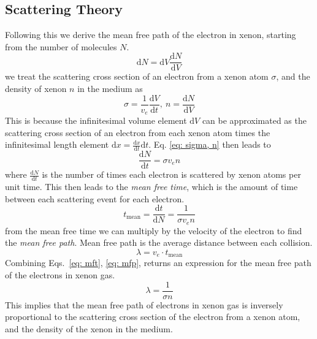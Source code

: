 \documentclass{article}
\begin{document}
\subsection{Scattering Theory}
\indent Following this we derive the mean free path of the electron in xenon, starting from the number of molecules $N$.
\begin{equation}
\mathrm{d}N = \mathrm{d}V\frac{\mathrm{d}N}{\mathrm{d}V}
\end{equation}
we treat the scattering cross section of an electron from a xenon atom $\sigma$, and the density of xenon $n$ in the medium as 
\begin{equation}
\sigma = \frac{1}{v_e}\frac{\mathrm{d}V}{\mathrm{d}t},~n=\frac{\mathrm{d}N}{\mathrm{d}V}
\label{eq: sigma, n}
\end{equation}
This is because the infinitesimal volume element $\mathrm{d}V$ can be approximated as the scattering cross section of an electron from each xenon atom times the infinitesimal length element $\mathrm{d}x=\frac{\mathrm{d}x}{\mathrm{d}t}\mathrm{d}t$.
Eq. \ref{eq: sigma, n} then leads to
\begin{equation}
\frac{\mathrm{d}N}{\mathrm{d}t}= \sigma v_en
\end{equation}
where $\frac{\mathrm{d}N}{\mathrm{d}t}$ is the number of times each electron is scattered by xenon atoms per unit time. This then leads to the \textit{mean free time}, which is the amount of time between each scattering event for each electron.
\begin{equation}
t_{\text{mean}}=\frac{\mathrm{d}t}{\mathrm{d}N}=\frac{1}{\sigma v_en}
\label{eq: mft}
\end{equation}
from the mean free time we can multiply by the velocity of the electron to find the \textit{mean free path}. Mean free path is the average distance between each collision.
\begin{equation}
\lambda = v_e\cdot t_{\text{mean}}
\label{eq: mfp}
\end{equation}
Combining Eqs.~\ref{eq: mft}, \ref{eq: mfp}, returns an expression for the mean free path of the electrons in xenon gas.\\
\begin{equation}
\lambda = \frac{1}{\sigma n}
\end{equation}
This implies that the mean free path of electrons in xenon gas is inversely proportional to the scattering cross section of the electron from a xenon atom, and the density of the xenon in the medium.\\
\end{document}
